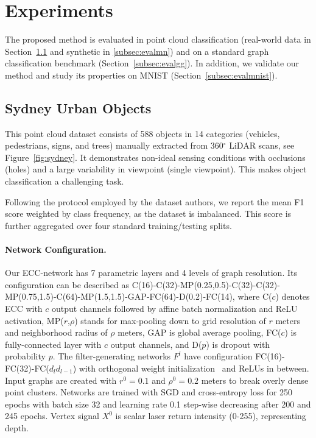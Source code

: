 \documentclass[10pt,twocolumn,letterpaper]{article}
\begin{document}
\section{Experiments}

The proposed method is evaluated in point cloud classification (real-world data in Section~\ref{subsec:evalpc} and synthetic in \ref{subsec:evalmn}) and on a standard graph classification benchmark (Section~\ref{subsec:evalgg}). In addition, we validate our method and study its properties on MNIST (Section~\ref{subsec:evalmnist}).

\subsection{Sydney Urban Objects} \label{subsec:evalpc}

This point cloud dataset \cite{trianglesvm} consists of 588 objects in 14 categories (vehicles, pedestrians, signs, and trees) manually extracted from 360$^{\circ}$ LiDAR scans, see Figure~\ref{fig:sydney}. It demonstrates non-ideal sensing conditions with occlusions (holes) and a large variability in viewpoint (single viewpoint). This makes object classification a challenging task. 

Following the protocol employed by the dataset authors, we report the mean F1 score weighted by class frequency, as the dataset is imbalanced. This score is further aggregated over four standard training/testing splits.

\paragraph*{Network Configuration.}
Our ECC-network has 7 parametric layers and 4 levels of graph resolution. Its configuration can be described as C(16)-C(32)-MP(0.25,0.5)-C(32)-C(32)-MP(0.75,1.5)-C(64)-MP(1.5,1.5)-GAP-FC(64)-D(0.2)-FC(14), where C($c$) denotes ECC with $c$ output channels followed by affine batch normalization and ReLU activation, MP($r$,$\rho$) stands for max-pooling down to grid resolution of $r$ meters and neighborhood radius of $\rho$ meters, GAP is global average pooling, FC($c$) is fully-connected layer with $c$ output channels, and D($p$) is dropout with probability $p$. The filter-generating networks $F^l$ have configuration FC(16)-FC(32)-FC($d_l d_{l-1}$) with orthogonal weight initialization~\cite{orthoinit} and ReLUs in between. Input graphs are created with $r^0=0.1$ and $\rho^0=0.2$ meters to break overly dense point clusters. Networks are trained with SGD and cross-entropy loss for 250 epochs with batch size 32 and learning rate 0.1 step-wise decreasing after 200 and 245 epochs. Vertex signal $X^0$ is scalar laser return intensity (0-255), representing depth.
\end{document}
